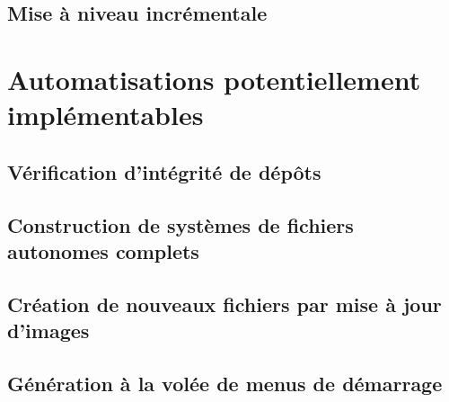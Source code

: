 \documentclass[12pt]{report}
\begin{document}
\ml
{\subsection{\todo}}
{\subsection{Mise à niveau incrémentale}}

\ml
{\section{\todo}}
{\section{Automatisations potentiellement implémentables}}

\ml
{\subsection{\todo}}
{\subsection{Vérification d’intégrité de dépôts}}

\ml
{\subsection{\todo}}
{\subsection{Construction de systèmes de fichiers autonomes complets}}

\ml
{\subsection{\todo}}
{\subsection{Création de nouveaux fichiers par mise à jour d’images}}

\ml
{\subsection{\todo}}
{\subsection{Génération à la volée de menus de démarrage}}
\end{document}
